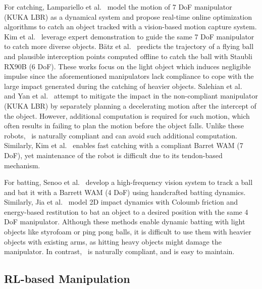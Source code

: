 For catching, Lampariello et al.~\cite{planning_for_catching}  model the motion of 7 DoF manipulator (KUKA LBR) as a dynamical system and propose real-time online optimization algorithms to catch an object tracked with a vision-based motion capture system. Kim et al.~\cite{kim2014catching} leverage expert demonstration to guide the same 7 DoF manipulator to catch more diverse objects.  B\"{a}tz et al.~\cite{batz2010dynamic} predicts the trajectory of a flying ball and plausible interception points computed offline to catch the ball with Staubli RX90B (6 DoF). 
These works focus on the light object which induces negligible impulse since the aforementioned manipulators lack compliance to cope with the large impact generated during the catching of heavier objects. Salehian et al.~\cite{salehian2016dynamical} and Yan et al.~\cite{yan2024impact} attempt to mitigate the impact in the non-compliant manipulator (KUKA LBR) by separately planning a decelerating motion after the intercept of the object.  However, additional computation is required for such motion, which often results in failing to plan the motion before the object falls. 
Unlike these robots, \robot~is naturally compliant and can avoid such additional computation.  Similarly, Kim et al.~\cite{free_flying} enables fast catching with a compliant Barret WAM (7 DoF), yet maintenance of the robot is difficult due to its tendon-based mechanism.

For batting, Senoo et al.~\cite{high_speed_batting} develop a high-frequency vision system to track a ball and bat it with a Barrett WAM (4 DoF) using handcrafted batting dynamics. Similarly, Jia et al.~\cite{jia2019batting} model 2D impact dynamics with Coloumb friction and energy-based restitution to bat an object to a desired position with the same 4 DoF manipulator. Although these methods enable dynamic batting with light objects like styrofoam or ping pong balls, it is difficult to use them with heavier objects with existing arms, as hitting heavy objects might damage the manipulator. In contrast, \robot~is naturally compliant, and is easy to maintain.


\subsection{RL-based Manipulation}


